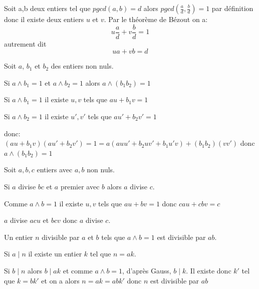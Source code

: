 \documentclass[french]{book}
\begin{document}
\begin{demo}
Soit a,b deux entiers tel que $pgcd(a,b)=d$ alors $pgcd(\frac{a}{d},\frac{b}{d})=1$ par définition donc il existe deux entiers $u$ et $v$. Par le théorème de Bézout on a:
 $$u\dfrac{a}{d}+v\dfrac{b}{d}=1$$
 autrement dit 
 $$ua+vb=d$$

\end{demo}

\begin{thm}

Soit $a$, $b_{1}$ et $b_{2}$ des entiers non nuls.

Si $a\wedge b_{1}=1$ et $a\wedge b_{2}=1$ alors $a\wedge (b_{1}b_{2})=1$  
\end{thm}

\begin{demo}

Si $a\wedge b_{1}=1$ il existe $u,v$ tels que $au+b_{1}v=1$

Si $a\wedge b_{2}=1$ il existe $u',v'$ tels que $au'+b_{2}v'=1$

donc: $(au+b_{1}v)(au'+b_{2}v')=1=a(auu'+b_{2}uv'+b_{1}u'v)+(b_{1}b_{2})(vv')$ donc $a\wedge (b_{1}b_{2})=1$  


\end{demo}

\begin{thm}

Soit $a,b,c$ entiers avec $a, b$ non nuls.

Si $a$ divise $bc$ et $a$ premier avec $b$ alors $a$ divise $c$.

\end{thm}

\begin{demo}

Comme $a \wedge b=1$ il existe $u,v$ tels que $au+bv=1$ donc $cau+cbv=c$

$a$ divise $acu$ et $bcv$ donc $a$ divise $c$.

\end{demo}

\begin{thm}

Un entier $n$ divisible par $a$ et $b$ tels que $a\wedge b=1$ est divisible par $ab$.
\end{thm}

\begin{demo}

Si $a\mid n$ il existe un entier $k$ tel que $n=ak$.

Si $b\mid n$ alors $b\mid ak$ et comme $a\wedge b=1$, d'après Gauss, $b\mid k$. Il existe donc $k'$ tel que $k=bk'$ et on a alors $n=ak=abk'$ donc $n$ est divisible par $ab$

\end{demo}
\end{document}
